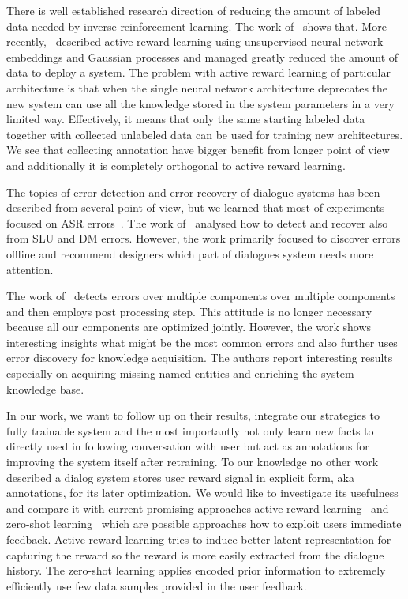 \documentclass[11pt]{article}
\begin{document}
There is well established research direction of reducing the amount of labeled data needed by inverse reinforcement learning.
The work of~\cite{nouri_cultural_2012} shows that.
More recently,~\cite{su2016active} described active reward learning using unsupervised neural network embeddings and Gaussian processes and managed greatly reduced the amount of data to deploy a system.
The problem with active reward learning of particular architecture is that when the single neural network architecture deprecates the new system can use all the knowledge stored in the system parameters in a very limited way.
Effectively, it means that only the same starting labeled data together with collected unlabeled data can be used for training new architectures. 
We see that collecting annotation have bigger benefit from longer point of view and additionally it is completely orthogonal to active reward learning.

The topics of error detection and error recovery of dialogue systems has been described from several point of view, but we learned that most of experiments focused on ASR errors~\cite{skantze_error_2007}.
The work of~\cite{meena_datadriven_2016} analysed how to detect and recover also from SLU and DM errors.
However, the work primarily focused to discover errors offline and recommend designers which part of dialogues system needs more attention.

The work of~\cite{pappu_knowledge_2014} detects errors over multiple components over multiple components and then employs post processing step.
This attitude is no longer necessary because all our components are optimized jointly.
However, the work shows interesting insights what might be the most common errors and also further uses error discovery for knowledge acquisition.
The authors report interesting results especially on acquiring missing named entities and enriching the system knowledge base.

In our work, we want to follow up on their results, integrate our strategies to fully trainable system and the most importantly not only learn new facts to directly used in following conversation with user but act as annotations for improving the system itself after retraining.
To our knowledge no other work described a dialog system stores user reward signal in explicit form, aka annotations, for its later optimization.
We would like to investigate its usefulness and compare it with current promising approaches active reward learning~\cite{su2016active} and 
zero-shot learning~\cite{vinyals_matching_2016} which are possible approaches how to exploit users immediate feedback.
Active reward learning tries to induce better latent representation for capturing the reward so the reward is more easily extracted from the dialogue history.
The zero-shot learning applies encoded prior information to extremely efficiently use few data samples provided in the user feedback.
\end{document}
